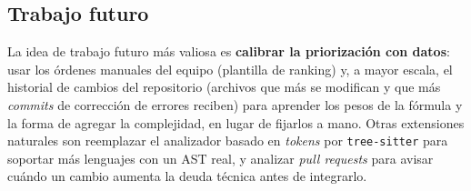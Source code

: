 \subsection{Trabajo futuro}

La idea de trabajo futuro más valiosa es \textbf{calibrar la priorización con datos}: usar los órdenes manuales del equipo (plantilla de ranking) y, a mayor escala, el historial de cambios del repositorio (archivos que más se modifican y que más \textit{commits} de corrección de errores reciben) para aprender los pesos de la fórmula y la forma de agregar la complejidad, en lugar de fijarlos a mano. Otras extensiones naturales son reemplazar el analizador basado en \textit{tokens} por \texttt{tree-sitter} para soportar más lenguajes con un AST real, y analizar \textit{pull requests} para avisar cuándo un cambio aumenta la deuda técnica antes de integrarlo.
